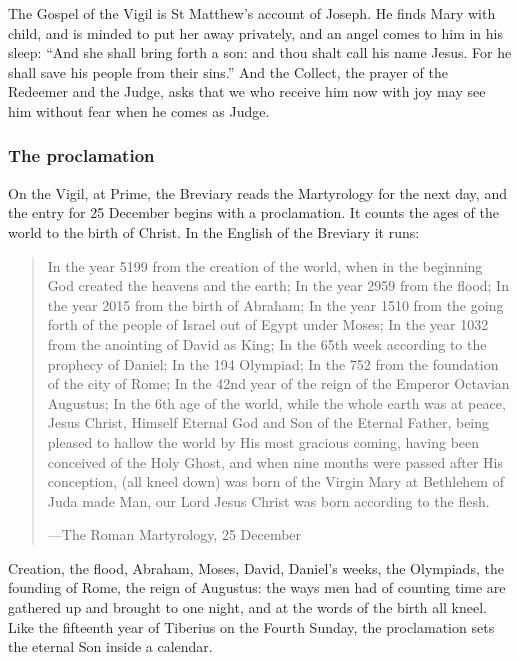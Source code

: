 The Gospel of the Vigil is St Matthew's account of Joseph. He finds Mary with
child, and is minded to put her away privately, and an angel comes to him in
his sleep: ``And she shall bring forth a son: and thou shalt call his name Jesus.
For he shall save his people from their sins.'' And the Collect, the prayer of
the Redeemer and the Judge, asks that we who receive him now with joy may see
him without fear when he comes as Judge.

\subsubsection*{The proclamation}

On the Vigil, at Prime, the Breviary reads the Martyrology for the next day,
and the entry for 25 December begins with a proclamation. It counts the ages of
the world to the birth of Christ. In the English of the Breviary it runs:

\begin{quote}
In the year 5199 from the creation of the world, when in the beginning God
created the heavens and the earth; In the year 2959 from the flood; In the year
2015 from the birth of Abraham; In the year 1510 from the going forth of the
people of Israel out of Egypt under Moses; In the year 1032 from the anointing
of David as King; In the 65th week according to the prophecy of Daniel; In the
194 Olympiad; In the 752 from the foundation of the city of Rome; In the 42nd
year of the reign of the Emperor Octavian Augustus; In the 6th age of the world,
while the whole earth was at peace, Jesus Christ, Himself Eternal God and Son of
the Eternal Father, being pleased to hallow the world by His most gracious
coming, having been conceived of the Holy Ghost, and when nine months were
passed after His conception, (all kneel down) was born of the Virgin Mary at
Bethlehem of Juda made Man, our Lord Jesus Christ was born according to the
flesh.\par
{\smallskip\noindent\small ---The Roman Martyrology, 25 December\par}
\end{quote}

Creation, the flood, Abraham, Moses, David, Daniel's weeks, the Olympiads, the
founding of Rome, the reign of Augustus: the ways men had of counting time are
gathered up and brought to one night, and at the words of the birth all
kneel. Like the fifteenth year of Tiberius on the Fourth Sunday, the
proclamation sets the eternal Son inside a calendar.


